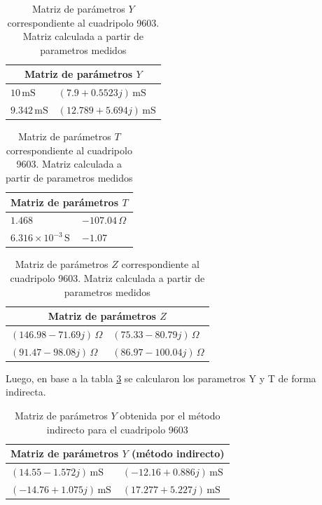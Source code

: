 	\begin{table}[H]
\centering
\begin{tabular}{|l|l|}
\hline
\multicolumn{2}{|c|}{\textbf{Matriz de parámetros $Y$}} \\ \hline
$10\,\mathrm{mS}$ & $(7.9 + 0.5523j)\,\mathrm{mS}$ \\ \hline
$9.342\,\mathrm{mS}$ & $(12.789 + 5.694j)\,\mathrm{mS}$ \\ \hline
\end{tabular}
\caption{Matriz de parámetros $Y$ correspondiente al cuadripolo 9603. Matriz calculada a partir de parametros medidos}
\label{tab:matriz_Y9603}
\end{table}

\begin{table}[H]
\centering
\begin{tabular}{|l|l|}
\hline
\multicolumn{2}{|c|}{\textbf{Matriz de parámetros $T$}} \\ \hline
$1.468$ & $-107.04\,\Omega$ \\ \hline
$6.316\times10^{-3}\,\mathrm{S}$ & $-1.07$ \\ \hline
\end{tabular}
\caption{Matriz de parámetros $T$ correspondiente al cuadripolo 9603. Matriz calculada a partir de parametros medidos}
\label{tab:matriz_T9603}
\end{table}

\begin{table}[H]
\centering
\begin{tabular}{|l|l|}
\hline
\multicolumn{2}{|c|}{\textbf{Matriz de parámetros $Z$}} \\ \hline
$(146.98 - 71.69j)\,\Omega$ & $(75.33 - 80.79j)\,\Omega$ \\ \hline
$(91.47 - 98.08j)\,\Omega$ & $(86.97 - 100.04j)\,\Omega$ \\ \hline
\end{tabular}
\caption{Matriz de parámetros $Z$ correspondiente al cuadripolo 9603. Matriz calculada a partir de parametros medidos}
\label{tab:matriz_Z9603}
\end{table}

Luego, en base a la tabla \ref{tab:matriz_Z9603} se calcularon los parametros Y y T de forma indirecta.

\begin{table}[H]
\centering
\begin{tabular}{|l|l|}
\hline
\multicolumn{2}{|c|}{\textbf{Matriz de parámetros $Y$ (método indirecto)}} \\ \hline
$(14.55 - 1.572j)\,\mathrm{mS}$ & $(-12.16 + 0.886j)\,\mathrm{mS}$ \\ \hline
$(-14.76 + 1.075j)\,\mathrm{mS}$ & $(17.277 + 5.227j)\,\mathrm{mS}$ \\ \hline
\end{tabular}
\caption{Matriz de parámetros $Y$ obtenida por el método indirecto para el cuadripolo 9603}
\label{tab:matriz_Y9603_indirecta}
\end{table}

